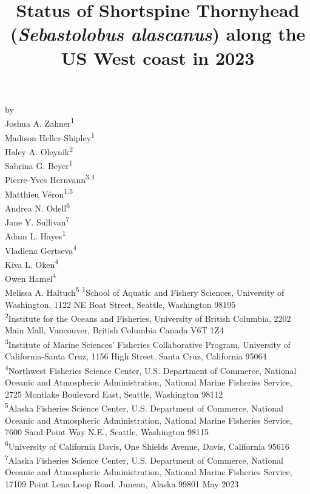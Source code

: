 \documentclass[11pt,
  english,
  letterpaper,
]{article}
\date{}
\newcommand{\trTitle}{Status of Shortspine Thornyhead (\emph{Sebastolobus alascanus}) along the US West coast in 2023}
\newcommand{\trYear}{2023}
\newcommand{\trMonth}{May}
\begin{document}

\renewcommand*{\thefootnote}{\fnsymbol{footnote}}

\small
\thispagestyle{empty}
\noindent
\begin{center}
\title{Status of Shortspine Thornyhead (\emph{Sebastolobus alascanus}) along the US West coast in 2023}
\vspace{1.5cm}
{\Large\textbf{}}
\vfill
by\\
Joshua A. Zahner\textsuperscript{1}\\
Madison Heller-Shipley\textsuperscript{1}\\
Haley A. Oleynik\textsuperscript{2}\\
Sabrina G. Beyer\textsuperscript{1}\\
Pierre-Yves Hernvann\textsuperscript{3,4}\\
Matthieu Véron\textsuperscript{1,5}\\
Andrea N. Odell\textsuperscript{6}\\
Jane Y. Sullivan\textsuperscript{7}\\
Adam L. Hayes\textsuperscript{1}\\
Vladlena Gertseva\textsuperscript{4}\\
Kiva L. Oken\textsuperscript{4}\\
Owen Hamel\textsuperscript{4}\\
Melissa A. Haltuch\textsuperscript{5}\vfill
\textsuperscript{1}School of Aquatic and Fishery Sciences, University of Washington, 1122 NE Boat Street, Seattle, Washington 98195\\
\textsuperscript{2}Institute for the Oceans and Fisheries, University of British Columbia, 2202 Main Mall, Vancouver, British Columbia Canada V6T 1Z4\\
\textsuperscript{3}Institute of Marine Sciences' Fisheries Collaborative Program, University of California-Santa Cruz, 1156 High Street, Santa Cruz, California 95064\\
\textsuperscript{4}Northwest Fisheries Science Center, U.S. Department of Commerce, National Oceanic and Atmospheric Administration, National Marine Fisheries Service, 2725 Montlake Boulevard East, Seattle, Washington 98112\\
\textsuperscript{5}Alaska Fisheries Science Center, U.S. Department of Commerce, National Oceanic and Atmospheric Administration, National Marine Fisheries Service, 7600 Sand Point Way N.E., Seattle, Washington 98115\\
\textsuperscript{6}University of California Davis, One Shields Avenue, Davis, California 95616\\
\textsuperscript{7}Alaska Fisheries Science Center, U.S. Department of Commerce, National Oceanic and Atmospheric Administration, National Marine Fisheries Service, 17109 Point Lena Loop Road, Juneau, Alaska 99801\vfill
\trMonth{} \trYear{}
\end{center}
\clearpage
\end{document}
